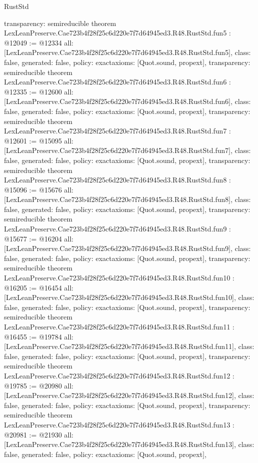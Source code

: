 \begin{lexlean}{RustStd}
\begin{coremodule}
{  transparency: semireducible
}
theorem LexLeanPreserve.Cae723b4f28f25c6d220e7f7d64945ed3.R48.RustStd.fun5 : @12049 := @12334 {
  all: [LexLeanPreserve.Cae723b4f28f25c6d220e7f7d64945ed3.R48.RustStd.fun5],
  class: false,
  generated: false,
  policy: exact{axioms: [Quot.sound, propext]},
  transparency: semireducible
}
theorem LexLeanPreserve.Cae723b4f28f25c6d220e7f7d64945ed3.R48.RustStd.fun6 : @12335 := @12600 {
  all: [LexLeanPreserve.Cae723b4f28f25c6d220e7f7d64945ed3.R48.RustStd.fun6],
  class: false,
  generated: false,
  policy: exact{axioms: [Quot.sound, propext]},
  transparency: semireducible
}
theorem LexLeanPreserve.Cae723b4f28f25c6d220e7f7d64945ed3.R48.RustStd.fun7 : @12601 := @15095 {
  all: [LexLeanPreserve.Cae723b4f28f25c6d220e7f7d64945ed3.R48.RustStd.fun7],
  class: false,
  generated: false,
  policy: exact{axioms: [Quot.sound, propext]},
  transparency: semireducible
}
theorem LexLeanPreserve.Cae723b4f28f25c6d220e7f7d64945ed3.R48.RustStd.fun8 : @15096 := @15676 {
  all: [LexLeanPreserve.Cae723b4f28f25c6d220e7f7d64945ed3.R48.RustStd.fun8],
  class: false,
  generated: false,
  policy: exact{axioms: [Quot.sound, propext]},
  transparency: semireducible
}
theorem LexLeanPreserve.Cae723b4f28f25c6d220e7f7d64945ed3.R48.RustStd.fun9 : @15677 := @16204 {
  all: [LexLeanPreserve.Cae723b4f28f25c6d220e7f7d64945ed3.R48.RustStd.fun9],
  class: false,
  generated: false,
  policy: exact{axioms: [Quot.sound, propext]},
  transparency: semireducible
}
theorem LexLeanPreserve.Cae723b4f28f25c6d220e7f7d64945ed3.R48.RustStd.fun10 : @16205 := @16454 {
  all: [LexLeanPreserve.Cae723b4f28f25c6d220e7f7d64945ed3.R48.RustStd.fun10],
  class: false,
  generated: false,
  policy: exact{axioms: [Quot.sound, propext]},
  transparency: semireducible
}
theorem LexLeanPreserve.Cae723b4f28f25c6d220e7f7d64945ed3.R48.RustStd.fun11 : @16455 := @19784 {
  all: [LexLeanPreserve.Cae723b4f28f25c6d220e7f7d64945ed3.R48.RustStd.fun11],
  class: false,
  generated: false,
  policy: exact{axioms: [Quot.sound, propext]},
  transparency: semireducible
}
theorem LexLeanPreserve.Cae723b4f28f25c6d220e7f7d64945ed3.R48.RustStd.fun12 : @19785 := @20980 {
  all: [LexLeanPreserve.Cae723b4f28f25c6d220e7f7d64945ed3.R48.RustStd.fun12],
  class: false,
  generated: false,
  policy: exact{axioms: [Quot.sound, propext]},
  transparency: semireducible
}
theorem LexLeanPreserve.Cae723b4f28f25c6d220e7f7d64945ed3.R48.RustStd.fun13 : @20981 := @21930 {
  all: [LexLeanPreserve.Cae723b4f28f25c6d220e7f7d64945ed3.R48.RustStd.fun13],
  class: false,
  generated: false,
  policy: exact{axioms: [Quot.sound, propext]},
}
\end{coremodule}
\end{lexlean}
